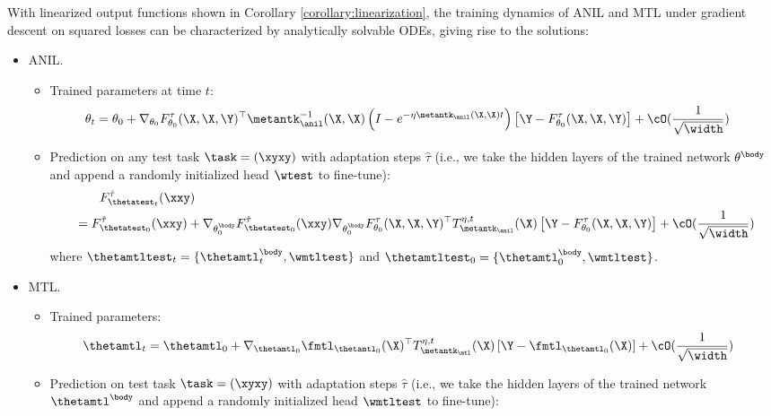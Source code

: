 \documentclass{article}
\begin{document}
\begin{lemma}\label{lemma:lienarization}
With linearized output functions shown in Corollary \ref{corollary:linearization}, the training dynamics of ANIL and MTL under gradient descent on squared losses can be characterized by analytically solvable ODEs, giving rise to the solutions:
\begin{itemize}[leftmargin=*,align=left,noitemsep,nolistsep]
    \item ANIL.
    \begin{itemize}[leftmargin=*,align=left,noitemsep,nolistsep]
        \item Trained parameters at time $t$:
        \begin{align}
            \theta_t &= \theta_0 + \nabla_{\theta_0} F^\tau_{\theta_0}(\X,\X,\Y)^\top \metantk_\anil^{-1}(\X,\X) \left(I - e^{-\eta \metantk_\anil (\X,\X) t}\right) \left[\Y-F^\tau_{\theta_0}(\X,\X,\Y) \right] + \cO(\frac{1}{\sqrt{\width}})
\end{align}
\item Prediction on any test task $\task=(\xyxy)$ with adaptation steps $\hat\tau$ (i.e., we take the hidden layers of the trained network $\theta^\body$ and append a randomly initialized head $\wtest$ to fine-tune):
        \begin{align}\label{eq:F_t-test}
            &\qquad F^{\hat\tau}_{\thetatest_t}(\xxy) \\
& = F^{\hat\tau}_{\thetatest_0}(\xxy) + \nabla_{\theta_0^\body} F^{\hat \tau}_{\thetatest_0} (\xxy) \nabla_{\theta_0^\body} F^{\tau}_{\theta_0} (\X,\X,\Y)^\top  T^{\eta,t}_{\metantk_\anil}(\X) \left[\Y - F^\tau_{\theta_0}(\X,\X,\Y)\right] + \cO(\frac{1}{\sqrt{\width}})\nonumber
        \end{align}
        where $\thetamtltest_t = \{\thetamtl_t^\body, \wmtltest\}$ and $\thetamtltest_0 = \{\thetamtl_0^\body, \wmtltest\}$.
    \end{itemize}
    \item MTL.
    \begin{itemize}[leftmargin=*,align=left,noitemsep,nolistsep]
        \item Trained parameters:
        \begin{align}
            \thetamtl_t 
&=\thetamtl_0 + \nabla_{\thetamtl_0} \fmtl_{\thetamtl_0}(\X)^\top T^{\eta,t}_{\metantk_\mtl}(\X) \left[\Y - \fmtl_{\thetamtl_0}(\X) \right]+ \cO(\frac{1}{\sqrt{\width}})
        \end{align}
\item Prediction on test task $\task=(\xyxy)$ with adaptation steps $\hat\tau$ (i.e., we take the hidden layers of the trained network $\thetamtl^\body$ and append a randomly initialized head $\wmtltest$ to fine-tune):

\end{itemize}
\end{itemize}
\end{lemma}
\end{document}
